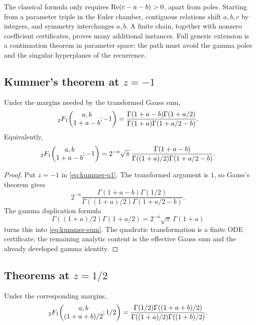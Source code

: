 \begin{remark}
The classical formula only requires \(\operatorname{Re}(c-a-b)>0\), apart from poles.
Starting from a parameter triple in the Euler chamber, contiguous relations
shift \(a,b,c\) by integers, and symmetry interchanges \(a,b\).  A finite
chain, together with nonzero coefficient certificates, proves many additional
instances.  Full generic extension is a \StatusC{} continuation theorem in
parameter space: the path must avoid the gamma poles and the singular
hyperplanes of the recurrence.
\end{remark}

\subsection{Kummer's theorem at \(z=-1\)}

\begin{theorem}\label{thm:kummer-sum}
Under the margins needed by the transformed Gauss sum,
\begin{equation}\label{eq:kummer-sum}
 {}_2F_1\!\left(\begin{matrix}a,b\\1+a-b\end{matrix};-1\right)
 =\frac{\Gamma(1+a-b)\Gamma(1+a/2)}
        {\Gamma(1+a)\Gamma(1+a/2-b)}.
\end{equation}
Equivalently,
\[
 {}_2F_1\!\left(\begin{matrix}a,b\\1+a-b\end{matrix};-1\right)
 =2^{-a}\sqrt\pi\,
  \frac{\Gamma(1+a-b)}
       {\Gamma((1+a)/2)\Gamma(1+a/2-b)}.
\]
\end{theorem}

\begin{proof}
Put \(z=-1\) in \eqref{eq:kummer-q1}.  The transformed argument is \(1\),
so Gauss's theorem gives
\[
 2^{-a}\frac{\Gamma(1+a-b)\Gamma(1/2)}
 {\Gamma((1+a)/2)\Gamma(1+a/2-b)}.
\]
The gamma duplication formula
\[
 \Gamma((1+a)/2)\Gamma(1+a/2)
 =2^{-a}\sqrt\pi\,\Gamma(1+a)
\]
turns this into \eqref{eq:kummer-sum}.  The quadratic transformation is a
finite ODE certificate; the remaining analytic content is the effective
Gauss sum and the already developed gamma identity.
\end{proof}

\subsection{Theorems at \(z=1/2\)}

\begin{theorem}\label{thm:gauss-second}
Under the corresponding margins,
\begin{equation}\label{eq:gauss-second}
 {}_2F_1\!\left(\begin{matrix}a,b\\(1+a+b)/2\end{matrix};1/2\right)
 =\frac{\Gamma(1/2)\Gamma((1+a+b)/2)}
        {\Gamma((1+a)/2)\Gamma((1+b)/2)}.
\end{equation}
\end{theorem}

